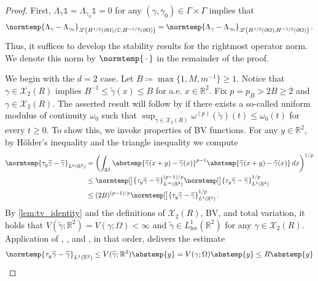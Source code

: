 \documentclass[pdflatex,sn-mathphys-num]{sn-jnl-preprint}
\let\originalleft\left %
\let\originalright\right
\renewcommand{\left}{\mathopen{}\mathclose\bgroup\originalleft}
\renewcommand{\right}{\aftergroup\egroup\originalright}
\newcommand{\R}{\mathbb{R}}
\newcommand{\C}{\mathbb{C}}
\newcommand{\cX}{\mathcal{X}}
\newcommand{\sL}{\mathscr{L}}
\newcommand{\pOmega}{{\partial\Omega}}
\newcommand{\dtn}{\Lambda_{\gamma}}
\newcommand{\dtnz}{\Lambda_{\gamma_0}}
\newcommand{\norm}{\normtemp}
\newcommand{\abs}{\abstemp}
\newcommand{\defeq}{\coloneqq} %
\newcommand{\diff}{d}
\newcommand{\dd}[1]{\,\diff{#1}}
\newcommand{\onebm}{\mathds{1}} %
\newcommand{\slot}{{\,\cdot\,}}
\theoremstyle{thmstyleone}%
\theoremstyle{thmstyletwo}%
\theoremstyle{thmstylethree}%
\numberwithin{equation}{section}
\numberwithin{theorem}{section}
\begin{document}
\begin{proof}
    First, $\dtn\onebm =\dtnz\onebm =0$ for any $(\gamma,\gamma_0)\in\Gamma\times\Gamma$ implies that
    \begin{align*}
        \norm{\Lambda_{\gamma} - \Lambda_{\gamma_0}}_{\sL\left(H^{1/2}(\pOmega)/\C;H^{-1/2}(\pOmega)\right)} =  \norm{\Lambda_{\gamma} - \Lambda_{\gamma_0}}_{\sL\left(H^{1/2}(\pOmega);H^{-1/2}(\pOmega)\right)}\,.
    \end{align*}
    Thus, it suffices to develop the stability results for the rightmost operator norm. We denote this norm by $\norm{\slot}$ in the remainder of the proof. 
    
    We begin with the $d=2$ case. Let $B \defeq \max\{1, M,m^{-1}\}\geq 1$. Notice that $\gamma\in\cX_2(R)$ implies $B^{-1}\leq\widetilde{\gamma}(x)\leq B$ for a.e. $x\in\R^2$. Fix $p=p_B > 2B\geq 2$ and $\gamma\in\cX_2(R)$. 
    The asserted result will follow by \cite[Thm.~1.6, pp.~5661--5662]{faraco2018characterization} if there exists a so-called uniform modulus of continuity $\omega_0$ such that $\sup_{\gamma\in\cX_2(R)} \omega^{(p)}(\widetilde{\gamma})(t)\leq \omega_0(t)$ for every $t\geq 0$. To show this, we invoke properties of BV functions. For any $y\in\R^2$, by H\"older's inequality and the triangle inequality we compute
    \begin{align*}
        \norm{\tau_y \widetilde{\gamma} - \widetilde{\gamma}}_{L^{p}(\R^2)}&=\biggl(\int_{\R^2}\abs{\widetilde{\gamma}(x+y)-\widetilde{\gamma}(x)}^{p-1} \abs{\widetilde{\gamma}(x+y)-\widetilde{\gamma}(x)} \dd{x}\biggr)^{1/p}\\
        &\leq \norm[\big]{\tau_y \widetilde{\gamma} - \widetilde{\gamma}}_{L^{\infty}(\R^2)}^{(p-1)/p}\norm[\big]{\tau_y \widetilde{\gamma} - \widetilde{\gamma}}_{L^{1}(\R^2)}^{1/p}\\
        &\leq (2B)^{(p-1)/p}\norm[\big]{\tau_y \widetilde{\gamma} - \widetilde{\gamma}}_{L^{1}(\R^2)}^{1/p}\,.
    \end{align*}
    By \cref{lem:tv_identity} and the definitions of $\cX_2(R)$, BV, and total variation, it holds that $V(\widetilde{\gamma};\R^2)=V(\gamma;\Omega)<\infty$ and $\widetilde{\gamma}\in L^1_{\mathrm{loc}}(\R^2)$ for any $\gamma\in\cX_2(R)$. Application of \cite[Exercise~14.3(ii), p. 460]{leoni2017first}, \cite[Exercise~14.3(i), p. 460]{leoni2017first}, and \cite[Lemma~14.37, p.~483]{leoni2017first}, in that order, delivers the estimate
    \begin{align*}
        \norm{\tau_y \widetilde{\gamma} - \widetilde{\gamma}}_{L^{1}(\R^2)}\leq  V(\widetilde{\gamma};\R^2)\abs{y}= V(\gamma;\Omega) \abs{y}\leq R \abs{y}

\end{align*}
\end{proof}
\end{document}
